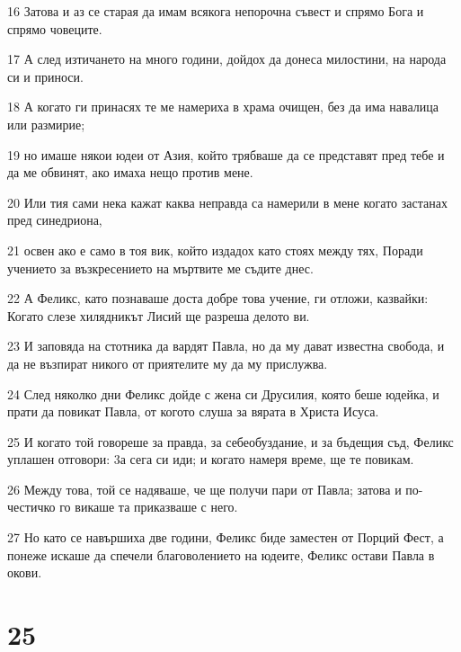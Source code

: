 \par 16 Затова и аз се старая да имам всякога непорочна съвест и спрямо Бога и спрямо човеците.
\par 17 А след изтичането на много години, дойдох да донеса милостини, на народа си и приноси.
\par 18 А когато ги принасях те ме намериха в храма очищен, без да има навалица или размирие;
\par 19 но имаше някои юдеи от Азия, който трябваше да се представят пред тебе и да ме обвинят, ако имаха нещо против мене.
\par 20 Или тия сами нека кажат каква неправда са намерили в мене когато застанах пред синедриона,
\par 21 освен ако е само в тоя вик, който издадох като стоях между тях, Поради учението за възкресението на мъртвите ме съдите днес.
\par 22 А Феликс, като познаваше доста добре това учение, ги отложи, казвайки: Когато слезе хилядникът Лисий ще разреша делото ви.
\par 23 И заповяда на стотника да вардят Павла, но да му дават известна свобода, и да не възпират никого от приятелите му да му прислужва.
\par 24 След няколко дни Феликс дойде с жена си Друсилия, която беше юдейка, и прати да повикат Павла, от когото слуша за вярата в Христа Исуса.
\par 25 И когато той говореше за правда, за себеобуздание, и за бъдещия съд, Феликс уплашен отговори: 3а сега си иди; и когато намеря време, ще те повикам.
\par 26 Между това, той се надяваше, че ще получи пари от Павла; затова и по-честичко го викаше та приказваше с него.
\par 27 Но като се навършиха две години, Феликс биде заместен от Порций Фест, а понеже искаше да спечели благоволението на юдеите, Феликс остави Павла в окови.

\chapter{25}


